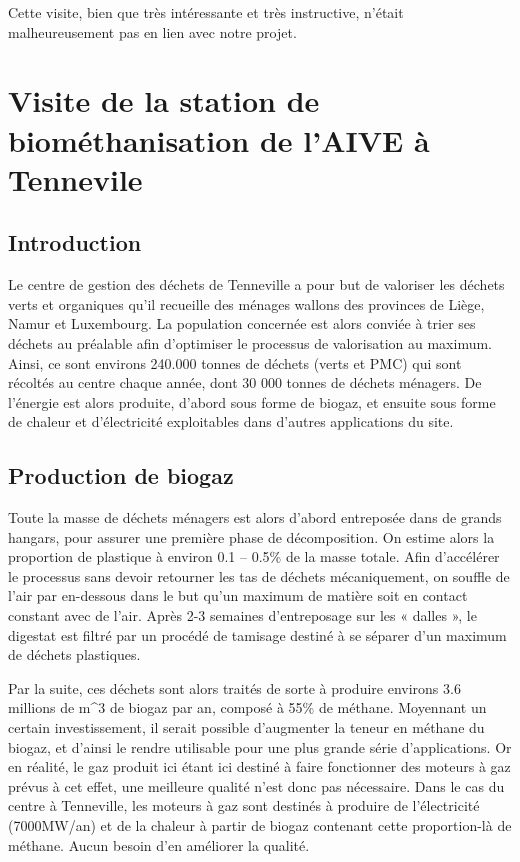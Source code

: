 Cette visite, bien que très intéressante et très instructive, n'était
malheureusement pas en lien avec notre projet.

\section{Visite de la station de biométhanisation de l'AIVE à Tennevile}
\subsection{Introduction}
Le centre de gestion des déchets de Tenneville a pour but de valoriser les 
déchets verts et organiques qu’il recueille des ménages wallons des provinces de 
Liège, Namur et Luxembourg. La population concernée est alors conviée à trier ses déchets 
au préalable afin d’optimiser le processus de valorisation au maximum. 
Ainsi, ce sont environs 240.000 tonnes de déchets (verts et PMC) qui sont récoltés 
au centre chaque année, dont 30 000 tonnes de déchets ménagers. De l’énergie est alors produite, 
d’abord sous forme de biogaz, et ensuite sous forme de chaleur et d’électricité exploitables 
dans d’autres applications du site.

\subsection{Production de biogaz}
Toute la masse de déchets ménagers est alors d’abord entreposée dans de grands hangars, 
pour assurer une première phase de décomposition. On estime alors la proportion de plastique 
à environ 0.1 – 0.5\% de la masse totale. Afin d’accélérer le processus sans devoir retourner 
les tas de déchets mécaniquement, on souffle de l’air par en-dessous dans le but qu’un maximum 
de matière soit en contact constant avec de l’air. Après 2-3 semaines d’entreposage sur 
les « dalles », le digestat est filtré par un procédé de tamisage destiné à se séparer d’un maximum de déchets plastiques. 

Par la suite, ces déchets sont alors traités de sorte à produire environs 3.6 millions de m^3 
de biogaz par an, composé à 55\% de méthane. Moyennant un certain investissement, il 
serait possible d’augmenter la teneur en méthane du biogaz, et d’ainsi le rendre utilisable 
pour une plus grande série d’applications.
Or en réalité, le gaz produit ici étant ici destiné à faire fonctionner des moteurs à gaz prévus à cet effet, 
une meilleure qualité n’est donc pas nécessaire. Dans le cas du centre à Tenneville, les moteurs 
à gaz sont destinés à produire de l’électricité (7000MW/an) et de la chaleur à partir de biogaz 
contenant cette proportion-là de méthane. Aucun besoin d’en améliorer la qualité. 

